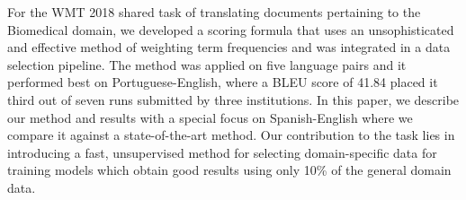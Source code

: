For the WMT 2018 shared task of translating documents pertaining to the Biomedical domain, we developed a scoring formula that uses an unsophisticated and effective method of weighting term frequencies and was integrated in a data selection pipeline. The method was applied on five language pairs and it performed best on Portuguese-English, where a BLEU score of 41.84 placed it third out of seven runs submitted by three institutions. In this paper, we describe our method and results with a special focus on Spanish-English where we compare it against a state-of-the-art method. Our contribution to the task lies in introducing a fast, unsupervised method for selecting domain-specific data for training models which obtain good results using only 10\% of the general domain data.
